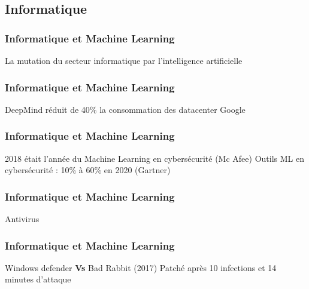 \subsection{Informatique}

\begin{frame}
  \frametitle{Informatique et Machine Learning}
  La mutation du secteur informatique par l'intelligence artificielle
\end{frame}

\begin{frame}
  \frametitle{Informatique et Machine Learning}
  DeepMind réduit de 40\% la consommation des datacenter Google
\end{frame}

\begin{frame}
  \frametitle{Informatique et Machine Learning}
  2018 était l'année du Machine Learning en cybersécurité (Mc Afee)
  \newline
  Outils ML en cybersécurité : 10\% à 60\% en 2020 (Gartner)
\end{frame}

\begin{frame}
  \frametitle{Informatique et Machine Learning}
  Antivirus 
  \newline
  \newline
  \begin{minipage}[c]{0.49\linewidth}
  \end{minipage}\hfill
  \begin{minipage}[c]{0.49\linewidth}
  \end{minipage}\hfill
\end{frame}

\begin{frame}
  \frametitle{Informatique et Machine Learning}
  Windows defender \textbf{Vs} Bad Rabbit (2017)
  \newline
  Patché après 10 infections et 14 minutes d'attaque
  \newline
  \newline
  \begin{minipage}[c]{0.49\linewidth}
  \end{minipage}\hfill
  \begin{minipage}[c]{0.49\linewidth}
  \end{minipage}\hfill
\end{frame}

